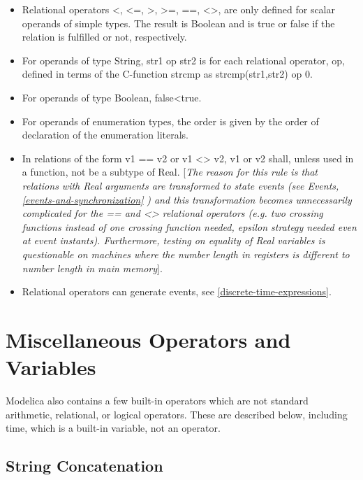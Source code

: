 \documentclass[10pt,a4paper]{report}
\def\doublelabel#1{\label{#1}\hypertarget{#1}{}}
\begin{document}
\begin{itemize}
\item
  Relational operators \textless{}, \textless{}=, \textgreater{},
  \textgreater{}=, ==, \textless{}\textgreater{}, are only defined for
  scalar operands of simple types. The result is Boolean and is true or
  false if the relation is fulfilled or not, respectively.
\item
  For operands of type String, str1 op str2 is for each relational
  operator, op, defined in terms of the C-function strcmp as
  strcmp(str1,str2) op 0.
\item
  For operands of type Boolean, false\textless{}true.
\item
  For operands of enumeration types, the order is given by the order of
  declaration of the enumeration literals.
\item
  In relations of the form v1 == v2 or v1 \textless{}\textgreater{} v2,
  v1 or v2 shall, unless used in a function, not be a subtype of Real.
  {[}\emph{The reason for this rule is that relations with Real
  arguments are transformed to state events (see Events, \ref{events-and-synchronization}}
  \emph{) and this transformation becomes unnecessarily complicated
  for the == and \textless{}\textgreater{} relational operators (e.g.
  two crossing functions instead of one crossing function needed,
  epsilon strategy needed even at event instants). Furthermore, testing
  on equality of Real variables is questionable on machines where the
  number length in registers is different to number length in main
  memory}{]}.
\item
  Relational operators can generate events, see \ref{discrete-time-expressions}.
\end{itemize}

\section{Miscellaneous Operators and Variables}\doublelabel{miscellaneous-operators-and-variables}

Modelica also contains a few built-in operators which are not standard
arithmetic, relational, or logical operators. These are described below,
including time, which is a built-in variable, not an operator.

\subsection{String Concatenation}\doublelabel{string-concatenation}
\end{document}
